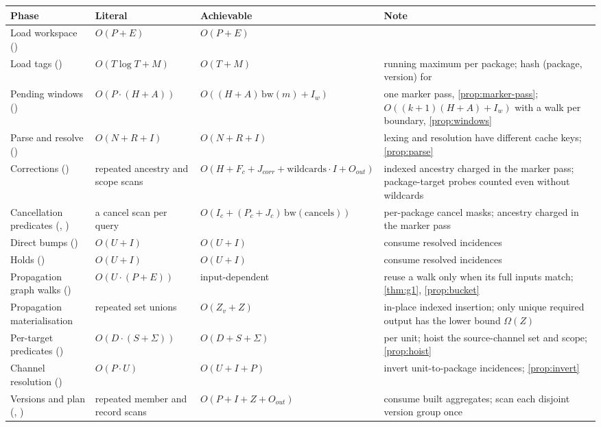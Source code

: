 \begin{center}
\footnotesize
\begin{longtable}{@{}L{3.4cm}L{2.7cm}L{3.2cm}L{4.9cm}@{}}
\toprule
Phase & Literal & Achievable & Note \\
\midrule
\endhead
Load workspace () & $O(P + E)$ & $O(P + E)$ & \\
Load tags () & $O(T \log T + M)$ & $O(T + M)$ & running maximum per package; hash (package, version) for  \\
Pending windows () & $O(P \cdot (H + A))$ & $O((H + A)\,\mathrm{bw}(m) + I_w)$ & one marker pass, \cref{prop:marker-pass}; $O((k+1)(H+A) + I_w)$ with a walk per boundary, \cref{prop:windows} \\
Parse and resolve () & $O(N + R + I)$ & $O(N + R + I)$ & lexing and resolution have different cache keys; \cref{prop:parse} \\
Corrections () & repeated ancestry and scope scans & $O(H + F_c + J_{corr} + \mathrm{wildcards} \cdot I + O_{out})$ & indexed ancestry charged in the marker pass; package-target probes counted even without wildcards \\
Cancellation predicates (, ) & a cancel scan per query & $O(I_c + (P_c + J_c)\,\mathrm{bw}(\mathrm{cancels}))$ & per-package cancel masks; ancestry charged in the marker pass \\
Direct bumps () & $O(U + I)$ & $O(U + I)$ & consume resolved incidences \\
Holds () & $O(U + I)$ & $O(U + I)$ & consume resolved incidences \\
Propagation graph walks () & $O(U \cdot (P + E))$ & input-dependent & reuse a walk only when its full inputs match; \cref{thm:g1}, \cref{prop:bucket} \\
Propagation materialisation & repeated set unions & $O(Z_v + Z)$ & in-place indexed insertion; only unique required output has the lower bound $\Omega(Z)$ \\
Per-target predicates () & $O(D \cdot (S + \Sigma))$ & $O(D + S + \Sigma)$ & per unit; hoist the source-channel set and scope; \cref{prop:hoist} \\
Channel resolution () & $O(P \cdot U)$ & $O(U + I + P)$ & invert unit-to-package incidences; \cref{prop:invert} \\
Versions and plan (, ) & repeated member and record scans & $O(P + I + Z + O_{out})$ & consume built aggregates; scan each disjoint version group once \\

\end{longtable}
\end{center}
